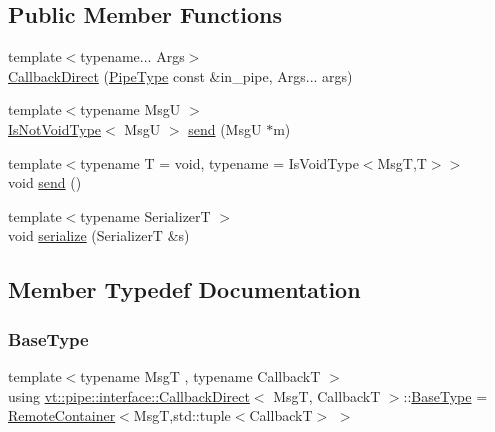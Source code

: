 \subsection*{Public Member Functions}
\begin{DoxyCompactItemize}
\item 
{\footnotesize template$<$typename... Args$>$ }\\\hyperlink{structvt_1_1pipe_1_1interface_1_1_callback_direct_acb59da0daedf51b2556d603b8910325e}{Callback\+Direct} (\hyperlink{namespacevt_ac9852acda74d1896f48f406cd72c7bd3}{Pipe\+Type} const \&in\+\_\+pipe, Args... args)
\item 
{\footnotesize template$<$typename MsgU $>$ }\\\hyperlink{structvt_1_1pipe_1_1interface_1_1_callback_direct_a619c2c4c96ec2573b87b992344c48826}{Is\+Not\+Void\+Type}$<$ MsgU $>$ \hyperlink{structvt_1_1pipe_1_1interface_1_1_callback_direct_a7379f2e63c757627089825c23e10475e}{send} (MsgU $\ast$m)
\item 
{\footnotesize template$<$typename T  = void, typename  = Is\+Void\+Type$<$\+Msg\+T,\+T$>$$>$ }\\void \hyperlink{structvt_1_1pipe_1_1interface_1_1_callback_direct_a2bda5c90901cc0acc3c406c968f9b43b}{send} ()
\item 
{\footnotesize template$<$typename SerializerT $>$ }\\void \hyperlink{structvt_1_1pipe_1_1interface_1_1_callback_direct_aeced2f2397fdb5bf3778f16036843eda}{serialize} (SerializerT \&s)
\end{DoxyCompactItemize}


\subsection{Member Typedef Documentation}
\mbox{\label{structvt_1_1pipe_1_1interface_1_1_callback_direct_aa69955f3321f6aa14a80a9b8d876025d}} 
\subsubsection{\texorpdfstring{Base\+Type}{BaseType}}
{\footnotesize\ttfamily template$<$typename MsgT , typename CallbackT $>$ \\
using \hyperlink{structvt_1_1pipe_1_1interface_1_1_callback_direct}{vt\+::pipe\+::interface\+::\+Callback\+Direct}$<$ MsgT, CallbackT $>$\+::\hyperlink{structvt_1_1pipe_1_1interface_1_1_callback_direct_aa69955f3321f6aa14a80a9b8d876025d}{Base\+Type} =  \hyperlink{structvt_1_1pipe_1_1interface_1_1_remote_container}{Remote\+Container}$<$MsgT,std\+::tuple$<$CallbackT$>$ $>$}

